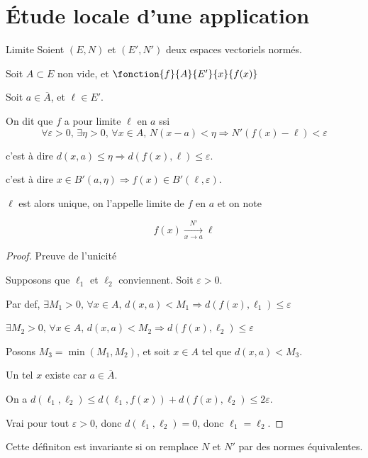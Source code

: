 \section{Étude locale d'une application}

\begin{definition}{Limite}{}
    Soient $(E, N)$ et $(E', N')$ deux espaces vectoriels normés. 

    Soit $A \subset E$ non vide, et $\fonction{f}{A}{E'}{x}{f(x)}$

    Soit $a \in \overline A$, et $\ell \in E'$.

    On dit que $f$ a pour limite $\ell$ en $a$ ssi 
    $$\forall \varepsilon > 0, \, \exists \eta > 0, \, \forall x \in A, \, N(x - a) < \eta \Rightarrow N'(f(x) - \ell) < \varepsilon$$

    c'est à dire $d(x, a) \leqslant \eta \Rightarrow d(f(x), \ell) \leqslant \varepsilon$.

    c'est à dire $x \in B'(a, \eta) \Rightarrow f(x) \in B'(\ell, \varepsilon)$.

    $\ell$ est alors unique, on l'appelle limite de $f$ en $a$ et on note 

    $$f(x) \xrightarrow[x \to a ]{N'} \ell$$

\end{definition}


\begin{proof}
    Preuve de l'unicité 

    Supposons que $\ell_1$ et $\ell_2$ conviennent. Soit $\varepsilon > 0$.

    Par def, $\exists M_1 > 0, \, \forall x \in A, \, d(x, a) < M_1  \Rightarrow d(f(x), \ell_1) \leqslant \varepsilon$

    $\exists M_2 > 0, \, \forall x \in A, \, d(x, a) < M_2  \Rightarrow d(f(x), \ell_2) \leqslant \varepsilon$

    Posons $M_3 = \min(M_1, M_2)$, et soit $x \in A$ tel que $d(x, a) < M_3$.

    Un tel $x$ existe car $a \in \overline A$.

    On a $d(\ell_1, \ell_2) \leqslant d(\ell_1, f(x)) + d(f(x), \ell_2) \leqslant 2 \varepsilon$.

    Vrai pour tout $\varepsilon > 0$, donc $d(\ell_1, \ell_2) = 0$, donc $\ell_1 = \ell_2$.
\end{proof}

\begin{remarque}
    Cette définiton est invariante si on remplace $N$ et $N'$ par des normes équivalentes.
\end{remarque}


